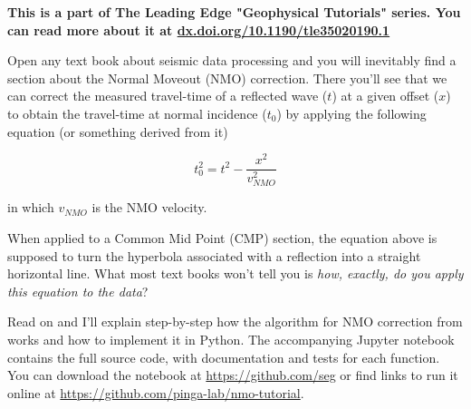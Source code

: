 \textbf{This is a part of The Leading Edge "Geophysical Tutorials" series.
You can read more about it at \href{https://dx.doi.org/10.1190/tle35020190.1}{dx.doi.org/10.1190/tle35020190.1}}

Open any text book about seismic data processing and you will inevitably find a
section about the Normal Moveout (NMO) correction.
There you'll see that we can correct the measured travel-time of a reflected
wave ($t$) at a given offset ($x$) to obtain the travel-time at normal
incidence ($t_0$) by applying the following equation (or something derived
from it)

\begin{equation}
t_0^2=t^2-\dfrac{x^2}{v_{NMO}^2}
\end{equation}

in which $v_{NMO}$ is the NMO velocity.

When applied to a Common Mid Point (CMP) section, the equation above is
supposed to turn the hyperbola associated with a reflection into a straight
horizontal line.
What most text books won't tell you is \textit{how, exactly, do you apply this
equation to the data}?

Read on and I'll explain step-by-step how the algorithm for NMO correction from
\citet{Yilmaz_2001} works and how to implement it in Python.
The accompanying Jupyter notebook \citep{Perez_2007} contains the full source
code, with documentation and tests for each function.
You can download the notebook at
\href{github.com/seg}{https://github.com/seg} or
find links to run it online at
\href{github.com/pinga-lab/nmo-tutorial}{https://github.com/pinga-lab/nmo-tutorial}.
